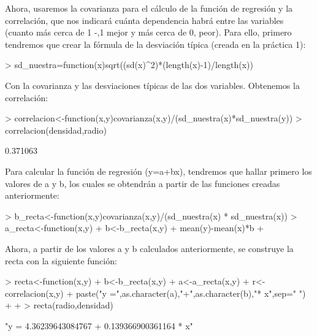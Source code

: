 \documentclass [a4paper] {article}
\begin{document}
Ahora, usaremos la covarianza para el cálculo de la función de regresión y la correlación, que nos indicará
cuánta dependencia habrá entre las variables (cuanto más cerca de 1 -,1 mejor y más cerca de 0, peor).
Para ello, primero tendremos que crear la fórmula de la desviación típica (creada en la práctica 1):

\begin{Schunk}
\begin{Sinput}
> sd_nuestra=function(x){sqrt((sd(x)^2)*(length(x)-1)/length(x))}
\end{Sinput}
\end{Schunk}

Con la covarianza y las desviaciones típicas de las dos variables. Obtenemos la correlación:


\begin{Schunk}
\begin{Sinput}
> correlacion<-function(x,y){covarianza(x,y)/(sd_nuestra(x)*sd_nuestra(y))}
> correlacion(densidad,radio)
\end{Sinput}
\begin{Soutput}
[1] 0.371063
\end{Soutput}
\end{Schunk}

Para calcular la función de regresión (y=a+bx), tendremos que hallar primero los valores de a y b, los cuales
se obtendrán a partir de las funciones creadas anteriormente:

\begin{Schunk}
\begin{Sinput}
> b_recta<-function(x,y){covarianza(x,y)/(sd_nuestra(x) * sd_nuestra(x))}
> a_recta<-function(x,y){
+ 	b<-b_recta(x,y)
+ 	mean(y)-mean(x)*b
+ }
\end{Sinput}
\end{Schunk}

Ahora, a partir de los valores a y b calculados anteriormente, se construye la recta con la siguiente función:

\begin{Schunk}
\begin{Sinput}
> recta<-function(x,y){
+ 	b<-b_recta(x,y)
+ 	a<-a_recta(x,y)
+ 	r<-correlacion(x,y)
+ 	paste("y =",as.character(a),"+",as.character(b),"* x",sep=" ")
+ 	
+ }
> recta(radio,densidad)
\end{Sinput}
\begin{Soutput}
[1] "y = 4.36239643084767 + 0.139366900361164 * x"
\end{Soutput}
\end{Schunk}
\end{document}

